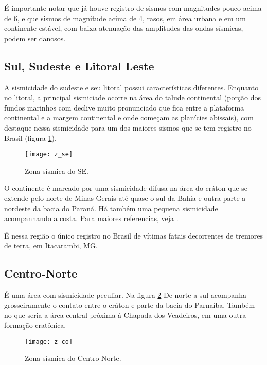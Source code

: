 É importante notar que já houve registro de sismos com magnitudes pouco acima de 6,
e que sismos de magnitude acima de 4, rasos, em área urbana e em um continente estável,
com baixa atenuação das amplitudes das ondas sísmicas, podem ser danosos.


\subsection{Sul, Sudeste e Litoral Leste}
\label{sec:z_se}

A sismicidade do sudeste e seu litoral possui características diferentes.
Enquanto no litoral, a principal sismiciade ocorre na área do talude continental
(porção dos fundos marinhos com declive muito pronunciado que fica entre a plataforma continental e
a margem continental e onde começam as planícies abissais), com destaque nessa sismicidade para um dos maiores sismos
que se tem registro no Brasil (figura \ref{fig:z_se}).

\begin{figure}[H]
  \centering
  \texttt{[image: z\_se]} 
  \caption{Zona sísmica do SE. \citet{dourado_2014}}
  \label{fig:z_se} 
\end{figure}

O continente é marcado por uma sismicidade difusa na área do cráton que se extende pelo norte de Minas
Gerais até quase o sul da Bahia e outra parte a nordeste da bacia do Paraná. 
Há também uma pequena sismicidade acompanhando a costa. Para maiores referencias, veja 
\citet{assumpcao_2004}.

É nessa região o único registro no Brasil de vítimas fatais decorrentes de tremores de terra, em Itacarambi, MG.

\subsection{Centro-Norte}
\label{sec:z_cn}

É uma área com sismicidade peculiar. Na figura \ref{fig:z_cn} De norte a sul acompanha grosseiramente o
contato entre o cráton e parte da bacia do Parnaíba. Também no que seria a 
área central próxima à Chapada dos Veadeiros, em uma outra formação cratônica.

\begin{figure}[H]
  \centering
  \texttt{[image: z\_co]} 
  \caption{Zona sísmica do Centro-Norte. \citet{dourado_2014}}
  \label{fig:z_cn} 
\end{figure}

